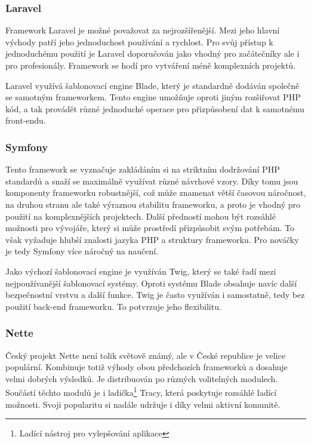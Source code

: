 \documentclass[czech,BP]{thesiskiv}
\begin{document}
	\subsubsection{Laravel}
	\par Framework Laravel je možné považovat za nejrozšířenější. Mezi jeho hlavní východy patří jeho jednoduchost používání a rychlost. Pro svůj přístup k jednoduchému použití je Laravel doporučován jako vhodný pro začátečníky ale i pro profesionály. Framework se hodí pro vytváření méně komplexních projektů.
	\par Laravel využívá šablonovací engine Blade, který je standardně dodáván společně se samotným frameworkem. Tento engine umožňuje oproti jiným rozšiřovat PHP kód, a tak provádět různé jednoduché operace pro přizpůsobení dat k samotnému front-endu.
	\subsubsection{Symfony}
	\par Tento framework se vyznačuje zakládáním si na striktním dodržování PHP standardů a snaží se maximálně využívat různé návrhové vzory. Díky tomu jsou komponenty frameworku robustnější, což může znamenat větší časovou náročnost, na druhou stranu ale také výraznou stabilitu frameworku, a proto je vhodný pro použití na komplexnějších projektech. Další předností mohou být rozsáhlé možnosti pro vývojáře, který si může prostředí přizpůsobit svým potřebám. To však vyžaduje hlubší znalosti jazyka PHP a struktury frameworku. Pro nováčky je tedy Symfony více náročný na naučení.
	\par Jako výchozí šablonovací engine je využíván Twig, který se také řadí mezi nejpoužívanější šablonovací systémy. Oproti systému Blade obsahuje navíc další bezpečnostní vrstvu a další funkce. Twig je často využíván i samostatně, tedy bez použití back-end frameworku. To potvrzuje jeho flexibilitu.
	\subsubsection{Nette}
	\par Český projekt Nette není tolik světově známý, ale v České republice je velice populární. Kombinuje totiž výhody obou předchozích frameworků a dosahuje velmi dobrých výsledků. Je distribuován po různých volitelných modulech. Součástí těchto modulů je i ladička\footnote{Ladící nástroj pro vylepšování aplikace} Tracy, která poskytuje rozsáhlé ladící možnosti. Svoji popularitu si nadále udržuje i díky velmi aktivní komunitě.
\end{document}
